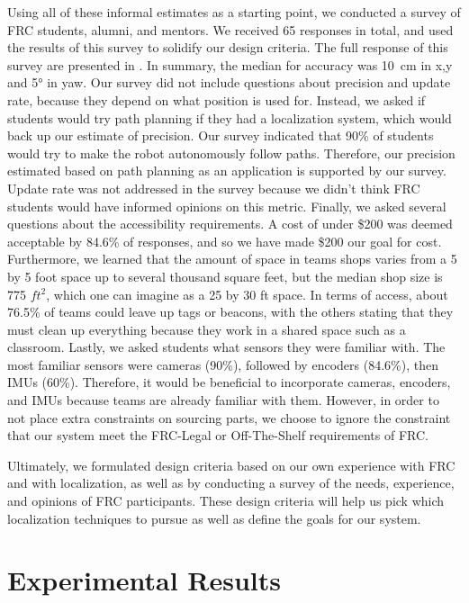 \documentclass{article}
\newcommand{\Newnameref}[1]{\textit{\nameref{#1}}}
\begin{document}
  Using all of these informal estimates as a starting point, we conducted a survey of FRC students, alumni, and mentors. We received 65 responses in total, and used the results of this survey to solidify our design criteria. The full response of this survey are presented in \Newnameref{appendix:survey}. In summary, the median for accuracy was \SI{10}{\centi\meter} in x,y and \ang{5} in yaw. Our survey did not include questions about precision and update rate, because they depend on what position is used for. Instead, we asked if students would try path planning if they had a localization system, which would back up our estimate of precision. Our survey indicated that 90\% of students would try to make the robot autonomously follow paths. Therefore, our precision estimated based on path planning as an application is supported by our survey. Update rate was not addressed in the survey because we didn't think FRC students would have informed opinions on this metric. Finally, we asked several questions about the accessibility requirements. A cost of under \$200 was deemed acceptable by 84.6\% of responses, and so we have made \$200 our goal for cost. Furthermore, we learned that the amount of space in teams shops varies from a 5 by 5 foot space up to several thousand square feet, but the median shop size is 775 $ft^2$, which one can imagine as a 25 by 30 ft space. In terms of access, about 76.5\% of teams could leave up tags or beacons, with the others stating that they must clean up everything because they work in a shared space such as a classroom. Lastly, we asked students what sensors they were familiar with. The most familiar sensors were cameras (90\%), followed by encoders (84.6\%), then IMUs (60\%). Therefore, it would be beneficial to incorporate cameras, encoders, and IMUs because teams are already familiar with them. However, in order to not place extra constraints on sourcing parts, we choose to ignore the constraint that our system meet the FRC-Legal or Off-The-Shelf requirements of FRC.

  Ultimately, we formulated design criteria based on our own experience with FRC and with localization, as well as by conducting a survey of the needs, experience, and opinions of FRC participants. These design criteria will help us pick which localization techniques to pursue as well as define the goals for our system.




\section{Experimental Results} \label{section:experiments}
\end{document}
